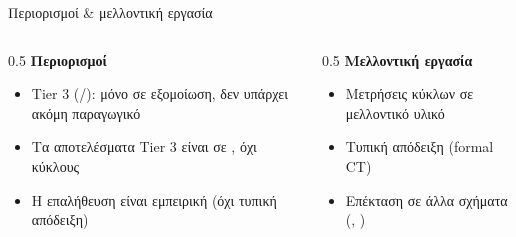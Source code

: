 \begin{frame}{Περιορισμοί \& μελλοντική εργασία}
  \begin{columns}[T,onlytextwidth]
    \begin{column}{0.5\textwidth}
      \textbf{Περιορισμοί}
      \begin{itemize}
        \item Tier 3 (\Zvbc/\Zvbb): μόνο σε εξομοίωση, δεν υπάρχει ακόμη παραγωγικό 
        \item Τα αποτελέσματα Tier 3 είναι σε \instret, όχι κύκλους
        \ifincludeCT\item Η  επαλήθευση είναι εμπειρική (όχι τυπική απόδειξη)\fi
      \end{itemize}
    \end{column}
    \begin{column}{0.5\textwidth}
      \textbf{Μελλοντική εργασία}
      \begin{itemize}
        \item Μετρήσεις κύκλων σε μελλοντικό  υλικό
        \ifincludeCT\item Τυπική απόδειξη  (formal CT)\fi
        \item Επέκταση σε άλλα  σχήματα (, )
      \end{itemize}
    \end{column}
  \end{columns}
\end{frame}

